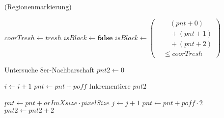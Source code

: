 \begin{algorithm}[!ht]
\caption{ (Regionenmarkierung)}
\label{alg:arlabeling-regionlabeling}
\begin{algorithmic}[1]
	\label{alg:arlabeling-regionlabeling-loop1-start}

		\label{alg:arlabeling-regionlabeling-loop2-start}

			\State $\mathit{coorTresh} \gets \mathit{tresh}$
			\label{alg:arlabeling-regionlabeling-threshold-start}
			\State $\mathit{isBlack} \gets \textbf{false}$
			\State $\mathit{isBlack} \gets \left(
			\begin{aligned}
				& \quad (\mathit{pnt} + 0) \\
				& \quad + (\mathit{pnt} + 1) \\
				& \quad + (\mathit{pnt} + 2) \\
				& \leq \mathit{coorTresh}
			\end{aligned}\right)$
			\label{alg:arlabeling-regionlabeling-calcblack}

			\label{alg:arlabeling-regionlabeling-isblack?}
				\State Untersuche 8er-Nachbarschaft
				\label{alg:arlabeling-regionlabeling-black}
			\Else
				\State $\mathit{pnt2} \gets 0$
				\label{alg:arlabeling-regionlabeling-notblack}
			\EndIf
			\label{alg:arlabeling-regionlabeling-threshold-end}

			\State $i \gets i + 1$
			\label{alg:arlabeling-regionlabeling-inc1-start}
			\State $\mathit{pnt} \gets \mathit{pnt} + \mathit{poff}$
			\State Inkrementiere $\mathit{pnt2}$
			\label{alg:arlabeling-regionlabeling-inc1-end}
		\EndFor
		\label{alg:arlabeling-regionlabeling-loop2-end}

		\State $\mathit{pnt} \gets \mathit{pnt} + \mathit{arImXsize} \cdot \mathit{pixelSize}$
		\label{alg:arlabeling-regionlabeling-inc2-start}
		\State $j \gets j + 1$
		\State $\mathit{pnt} \gets \mathit{pnt} + \mathit{poff} \cdot 2$
		\State $\mathit{pnt2} \gets \mathit{pnt2} + 2$
		\label{alg:arlabeling-regionlabeling-inc2-end}
	\EndFor
	\label{alg:arlabeling-regionlabeling-loop1-end}
\end{algorithmic}
\end{algorithm}